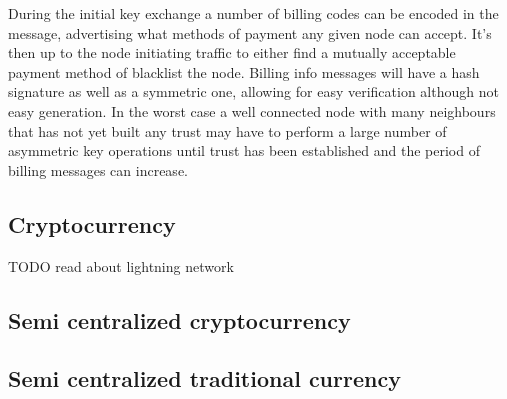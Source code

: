 \documentclass[11pt]{article}
\begin{document}
    During the initial key exchange a number of billing codes can be encoded in the message, advertising what methods of payment any given node can accept. It's then up to the node initiating traffic to either find a mutually acceptable payment method of blacklist the node. Billing info messages will have a hash signature as well as a symmetric one, allowing for easy verification although not easy generation. In the worst case a well connected node with many neighbours that has not yet built any trust may have to perform a large number of asymmetric key operations until trust has been established and the period of billing messages can increase.

    \subsection{Cryptocurrency}
    
          TODO read about lightning network
    
    \subsection{Semi centralized cryptocurrency}
    \subsection{Semi centralized traditional currency}

\medskip
\end{document}
